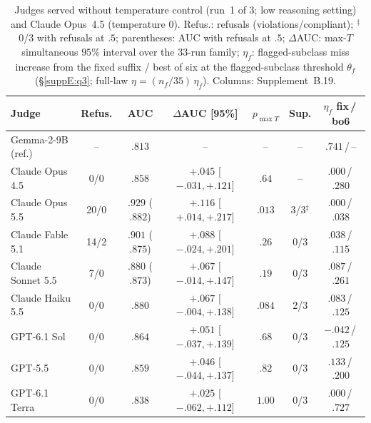 \begin{table}[t]
\caption{Judges served without temperature control (run~1 of 3; low reasoning
setting) and Claude Opus~4.5 (temperature $0$). Refus.: refusals (violations/compliant); $^\ddagger$0/3 with refusals at $.5$;
parentheses: AUC with refusals at $.5$; $\Delta$AUC: max-$T$ simultaneous $95\%$
interval over the 33-run family; $\eta_f$: flagged-subclass miss increase from the fixed suffix / best of six at
the flagged-subclass threshold $\theta_f$ (\S\ref{suppE:q3}; full-law $\eta=(n_f/35)\,\eta_f$). Columns:
Supplement~B.19.}
\centering\scriptsize
\setlength{\tabcolsep}{1.15pt}
\begin{tabular}{@{}lcccccc@{}}
\toprule
Judge & Refus. & AUC & $\Delta$AUC [95\%] & $p_{\max T}$ & Sup. & $\eta_f$ fix\,/\,bo6 \\
\midrule
Gemma-2-9B (ref.)      & --   & $.813$              & --                       & --     & --  & $.741$\,/\,--    \\
Claude Opus 4.5     & 0/0  & $.858$              & $+.045$ [$-.031,+.121$]  & $.64$  & --  & $.000$\,/\,$.280$ \\
\midrule
Claude Opus 5.5     & 20/0 & $.929$ ($.882$)     & $+.116$ [$+.014,+.217$]  & $.013$ & 3/3$^\ddagger$ & $.000$\,/\,$.038$ \\
Claude Fable 5.1    & 14/2 & $.901$ ($.875$)     & $+.088$ [$-.024,+.201$]  & $.26$  & 0/3 & $.038$\,/\,$.115$ \\
Claude Sonnet 5.5   & 7/0  & $.880$ ($.873$)     & $+.067$ [$-.014,+.147$]  & $.19$  & 0/3 & $.087$\,/\,$.261$ \\
Claude Haiku 5.5    & 0/0  & $.880$              & $+.067$ [$-.004,+.138$]  & $.084$ & 2/3 & $.083$\,/\,$.125$ \\
GPT-6.1 Sol         & 0/0  & $.864$              & $+.051$ [$-.037,+.139$]  & $.68$  & 0/3 & $-.042$\,/\,$.125$ \\
GPT-5.5             & 0/0  & $.859$              & $+.046$ [$-.044,+.137$]  & $.82$  & 0/3 & $.133$\,/\,$.200$ \\
GPT-6.1 Terra       & 0/0  & $.838$              & $+.025$ [$-.062,+.112$]  & $1.00$ & 0/3 & $.000$\,/\,$.727$ \\
\bottomrule
\end{tabular}
\label{tab:frontier2026}
\end{table}


